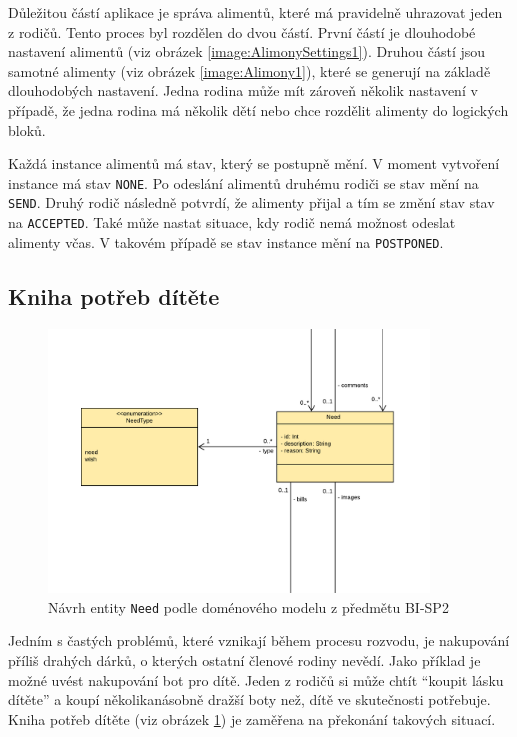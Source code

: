         Důležitou částí aplikace je správa alimentů, které má pravidelně uhrazovat jeden z rodičů. Tento proces byl rozdělen do dvou částí. První částí je dlouhodobé nastavení alimentů (viz obrázek \ref{image:AlimonySettings1}). Druhou částí jsou samotné alimenty (viz obrázek \ref{image:Alimony1}), které se generují na základě dlouhodobých nastavení. Jedna rodina může mít zároveň několik nastavení v případě, že jedna rodina má několik dětí nebo chce rozdělit alimenty do logických bloků.
        
        Každá instance alimentů má stav, který se postupně mění. V moment vytvoření instance má stav \verb|NONE|. Po odeslání alimentů druhému rodiči se stav mění na \verb|SEND|. Druhý rodič následně potvrdí, že alimenty přijal a tím se změní stav stav na \verb|ACCEPTED|. Také může nastat situace, kdy rodič nemá možnost odeslat alimenty včas. V takovém případě se stav instance mění na \verb|POSTPONED|.
    
    \subsection{Kniha potřeb dítěte}\label{analyza:navrh:need}
        \begin{figure}\centering
	        \includegraphics[width=0.9\textwidth]{pdfs/Need1}
	        \caption[Návrh \texttt{Need}]{Návrh entity \texttt{Need} podle doménového modelu z předmětu BI-SP2}\label{image:Need1}
        \end{figure}
        Jedním s častých problémů, které vznikají během procesu rozvodu, je nakupování příliš drahých dárků, o kterých ostatní členové rodiny nevědí. Jako příklad je možné uvést nakupování bot pro dítě. Jeden z rodičů si může chtít \enquote{koupit lásku dítěte} a koupí několikanásobně dražší boty než, dítě ve skutečnosti potřebuje. Kniha potřeb dítěte (viz obrázek \ref{image:Need1}) je zaměřena na překonání takových situací.
        
